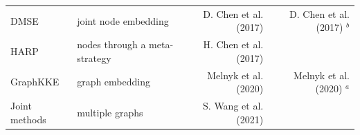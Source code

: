 \documentclass[10pt,oneside]{article}
\begin{document}
\begin{longtable}[]{@{}llrr@{}}
\begin{minipage}[t]{0.11\columnwidth}\raggedright
DMSE\strut
\end{minipage} & \begin{minipage}[t]{0.32\columnwidth}\raggedright
joint node embedding\strut
\end{minipage} & \begin{minipage}[t]{0.18\columnwidth}\raggedleft
D. Chen et al. (2017)\strut
\end{minipage} & \begin{minipage}[t]{0.28\columnwidth}\raggedleft
D. Chen et al. (2017) \(^b\)\strut
\end{minipage}\tabularnewline
\begin{minipage}[t]{0.11\columnwidth}\raggedright
HARP\strut
\end{minipage} & \begin{minipage}[t]{0.32\columnwidth}\raggedright
nodes through a meta-strategy\strut
\end{minipage} & \begin{minipage}[t]{0.18\columnwidth}\raggedleft
H. Chen et al. (2017)\strut
\end{minipage} & \begin{minipage}[t]{0.28\columnwidth}\raggedleft
\strut
\end{minipage}\tabularnewline
\begin{minipage}[t]{0.11\columnwidth}\raggedright
GraphKKE\strut
\end{minipage} & \begin{minipage}[t]{0.32\columnwidth}\raggedright
graph embedding\strut
\end{minipage} & \begin{minipage}[t]{0.18\columnwidth}\raggedleft
Melnyk et al. (2020)\strut
\end{minipage} & \begin{minipage}[t]{0.28\columnwidth}\raggedleft
Melnyk et al. (2020) \(^a\)\strut
\end{minipage}\tabularnewline
\begin{minipage}[t]{0.11\columnwidth}\raggedright
Joint methods\strut
\end{minipage} & \begin{minipage}[t]{0.32\columnwidth}\raggedright
multiple graphs\strut
\end{minipage} & \begin{minipage}[t]{0.18\columnwidth}\raggedleft
S. Wang et al. (2021)\strut
\end{minipage} & \begin{minipage}[t]{0.28\columnwidth}\raggedleft
\strut
\end{minipage}\tabularnewline
\bottomrule
\end{longtable}
\end{document}

